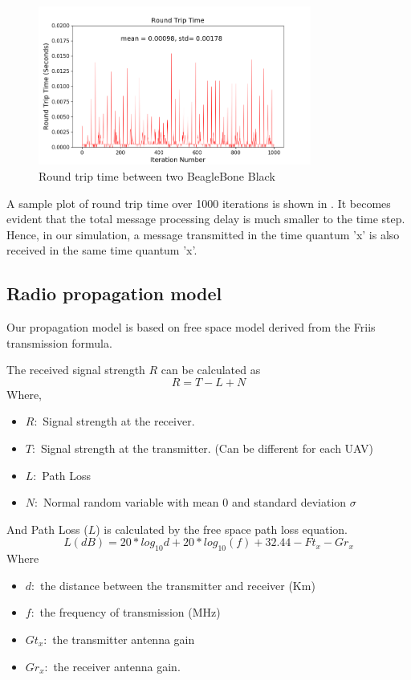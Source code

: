 \begin{figure}[hbtp]
\centering
\includegraphics[width=0.8\textwidth]{Chapter-4/figs/transmission_time}
\caption{Round trip time between two BeagleBone Black}
\label{fig:proc_delay_graph}
\end{figure}

A sample plot of round trip time over 1000 iterations is shown in . It becomes evident that the total message processing delay is much smaller to the time step. Hence, in our simulation, a message transmitted in the time quantum 'x' is also received in the same time quantum 'x'.

\subsection{Radio propagation model}
Our propagation model is based on free space model derived from the Friis transmission formula. \cite{5735774}

The received signal strength $R$ can be calculated as 
\begin{equation}
    R = T - L + N
\end{equation} 
Where,
\begin{itemize}
    \item $R : $ Signal strength at the receiver.
    \item $T : $ Signal strength at the transmitter. (Can be different for each UAV)
    \item $L : $ Path Loss
    \item $N : $ Normal random variable with mean $0$ and standard deviation $\sigma$
\end{itemize}
And Path Loss ($L$) is calculated by the free space path loss equation.
\begin{equation}
 L (dB) = 20 * log_{10} d + 20 * log_{10}(f) + 32.44 - Ft_x - Gr_x 
\end{equation}
Where
\begin{itemize}
    \item $d : $ the distance between the transmitter and receiver (Km)
	\item $f : $ the frequency of transmission (MHz)
    \item $Gt_x : $ the transmitter antenna gain 
    \item $Gr_x : $ the receiver antenna gain.
\end{itemize}


